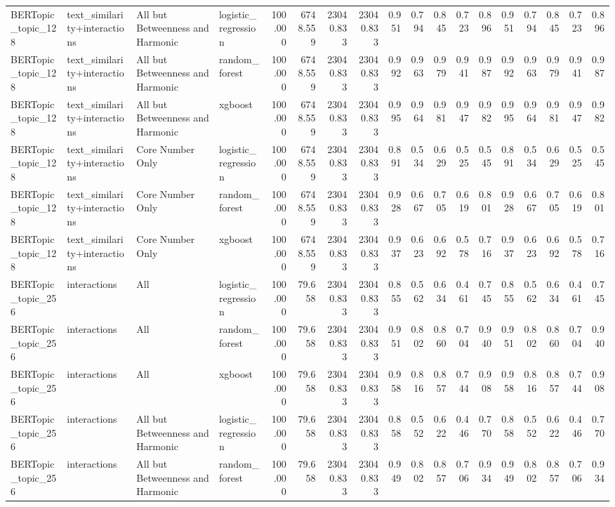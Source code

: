 \begin{tabular}{llllrrrrrrrrrrrrrr}
BERTopic_topic_128 & text_similarity+interactions & All but Betweenness and Harmonic & logistic_regression & 100.000 & 6748.559 & 23040.833 & 23040.833 & 0.951 & 0.794 & 0.845 & 0.723 & 0.896 & 0.951 & 0.794 & 0.845 & 0.723 & 0.896 \\
BERTopic_topic_128 & text_similarity+interactions & All but Betweenness and Harmonic & random_forest & 100.000 & 6748.559 & 23040.833 & 23040.833 & 0.992 & 0.963 & 0.979 & 0.941 & 0.987 & 0.992 & 0.963 & 0.979 & 0.941 & 0.987 \\
BERTopic_topic_128 & text_similarity+interactions & All but Betweenness and Harmonic & xgboost & 100.000 & 6748.559 & 23040.833 & 23040.833 & 0.995 & 0.964 & 0.981 & 0.947 & 0.982 & 0.995 & 0.964 & 0.981 & 0.947 & 0.982 \\
BERTopic_topic_128 & text_similarity+interactions & Core Number Only & logistic_regression & 100.000 & 6748.559 & 23040.833 & 23040.833 & 0.891 & 0.534 & 0.629 & 0.525 & 0.545 & 0.891 & 0.534 & 0.629 & 0.525 & 0.545 \\
BERTopic_topic_128 & text_similarity+interactions & Core Number Only & random_forest & 100.000 & 6748.559 & 23040.833 & 23040.833 & 0.928 & 0.667 & 0.705 & 0.619 & 0.801 & 0.928 & 0.667 & 0.705 & 0.619 & 0.801 \\
BERTopic_topic_128 & text_similarity+interactions & Core Number Only & xgboost & 100.000 & 6748.559 & 23040.833 & 23040.833 & 0.937 & 0.623 & 0.692 & 0.578 & 0.716 & 0.937 & 0.623 & 0.692 & 0.578 & 0.716 \\
BERTopic_topic_256 & interactions & All & logistic_regression & 100.000 & 79.658 & 23040.833 & 23040.833 & 0.855 & 0.562 & 0.634 & 0.461 & 0.745 & 0.855 & 0.562 & 0.634 & 0.461 & 0.745 \\
BERTopic_topic_256 & interactions & All & random_forest & 100.000 & 79.658 & 23040.833 & 23040.833 & 0.951 & 0.802 & 0.860 & 0.704 & 0.940 & 0.951 & 0.802 & 0.860 & 0.704 & 0.940 \\
BERTopic_topic_256 & interactions & All & xgboost & 100.000 & 79.658 & 23040.833 & 23040.833 & 0.958 & 0.816 & 0.857 & 0.744 & 0.908 & 0.958 & 0.816 & 0.857 & 0.744 & 0.908 \\
BERTopic_topic_256 & interactions & All but Betweenness and Harmonic & logistic_regression & 100.000 & 79.658 & 23040.833 & 23040.833 & 0.858 & 0.552 & 0.622 & 0.446 & 0.770 & 0.858 & 0.552 & 0.622 & 0.446 & 0.770 \\
BERTopic_topic_256 & interactions & All but Betweenness and Harmonic & random_forest & 100.000 & 79.658 & 23040.833 & 23040.833 & 0.949 & 0.802 & 0.857 & 0.706 & 0.934 & 0.949 & 0.802 & 0.857 & 0.706 & 0.934 \\

\end{tabular}
